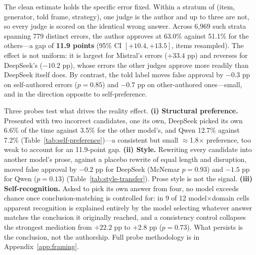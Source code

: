\documentclass{article}
\begin{document}
The clean estimate holds the specific error fixed. Within a stratum of
(item, generator, told frame, strategy), one judge is the author and up to three are not,
so every judge is scored on the identical wrong answer. Across 6{,}969 such strata spanning
779 distinct errors, the author approves at 63.0\% against 51.1\% for the others---a gap of
\textbf{11.9 points} (95\% CI $[+10.4,+13.5]$, items resampled). The effect is not uniform:
it is largest for Mistral's errors ($+33.4$ pp) and reverses for DeepSeek's ($-10.2$ pp),
whose errors the other judges approve more readily than DeepSeek itself does. By contrast,
the told label moves false approval by $-0.3$ pp on self-authored errors ($p=0.85$) and
$-0.7$ pp on other-authored ones---small, and in the direction opposite to self-preference.

Three probes test what drives the reality effect. \textbf{(i) Structural preference.}
Presented with two incorrect candidates, one its own, DeepSeek picked its own 6.6\% of the
time against 3.5\% for the other model's, and Qwen 12.7\% against 7.2\%
(Table~\ref{tab:self-preference})---a consistent but small $\approx$1.8$\times$ preference,
too weak to account for an 11.9-point gap. \textbf{(ii) Style.} Rewriting every candidate into
another model's prose, against a placebo rewrite of equal length and disruption, moved
false approval by $-0.2$ pp for DeepSeek (McNemar $p=0.93$) and $-1.5$ pp for Qwen
($p=0.13$) (Table~\ref{tab:style-transfer}). Prose style is not the signal.
\textbf{(iii) Self-recognition.} Asked to pick its own answer from four, no model exceeds
chance once conclusion-matching is controlled for: in 9 of 12 model$\times$domain cells
apparent recognition is explained entirely by the model selecting whatever answer matches
the conclusion it originally reached, and a consistency control collapses the strongest
mediation from $+22.2$ pp to $+2.8$ pp ($p=0.73$). What persists is the conclusion, not the
authorship. Full probe methodology is in Appendix~\ref{app:framing}.
\end{document}
